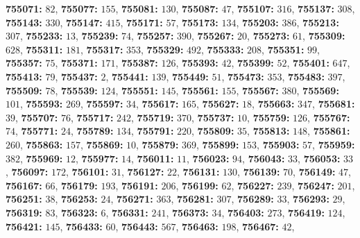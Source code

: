 \textsf{\bfseries 755071:} $82$, \textsf{\bfseries 755077:} $155$, \textsf{\bfseries 755081:} $130$, \textsf{\bfseries 755087:} $47$, \textsf{\bfseries 755107:} $316$, \textsf{\bfseries 755137:} $308$, \textsf{\bfseries 755143:} $330$, \textsf{\bfseries 755147:} $415$, \textsf{\bfseries 755171:} $57$, \textsf{\bfseries 755173:} $134$, \textsf{\bfseries 755203:} $386$, \textsf{\bfseries 755213:} $307$, \textsf{\bfseries 755233:} $13$, \textsf{\bfseries 755239:} $74$, \textsf{\bfseries 755257:} $390$, \textsf{\bfseries 755267:} $20$, \textsf{\bfseries 755273:} $61$, \textsf{\bfseries 755309:} $628$, \textsf{\bfseries 755311:} $181$, \textsf{\bfseries 755317:} $353$, \textsf{\bfseries 755329:} $492$, \textsf{\bfseries 755333:} $208$, \textsf{\bfseries 755351:} $99$, \textsf{\bfseries 755357:} $75$, \textsf{\bfseries 755371:} $171$, \textsf{\bfseries 755387:} $126$, \textsf{\bfseries 755393:} $42$, \textsf{\bfseries 755399:} $52$, \textsf{\bfseries 755401:} $647$, \textsf{\bfseries 755413:} $79$, \textsf{\bfseries 755437:} $2$, \textsf{\bfseries 755441:} $139$, \textsf{\bfseries 755449:} $51$, \textsf{\bfseries 755473:} $353$, \textsf{\bfseries 755483:} $397$, \textsf{\bfseries 755509:} $78$, \textsf{\bfseries 755539:} $124$, \textsf{\bfseries 755551:} $145$, \textsf{\bfseries 755561:} $155$, \textsf{\bfseries 755567:} $380$, \textsf{\bfseries 755569:} $101$, \textsf{\bfseries 755593:} $269$, \textsf{\bfseries 755597:} $34$, \textsf{\bfseries 755617:} $165$, \textsf{\bfseries 755627:} $18$, \textsf{\bfseries 755663:} $347$, \textsf{\bfseries 755681:} $39$, \textsf{\bfseries 755707:} $76$, \textsf{\bfseries 755717:} $242$, \textsf{\bfseries 755719:} $370$, \textsf{\bfseries 755737:} $10$, \textsf{\bfseries 755759:} $126$, \textsf{\bfseries 755767:} $74$, \textsf{\bfseries 755771:} $24$, \textsf{\bfseries 755789:} $134$, \textsf{\bfseries 755791:} $220$, \textsf{\bfseries 755809:} $35$, \textsf{\bfseries 755813:} $148$, \textsf{\bfseries 755861:} $260$, \textsf{\bfseries 755863:} $157$, \textsf{\bfseries 755869:} $10$, \textsf{\bfseries 755879:} $369$, \textsf{\bfseries 755899:} $153$, \textsf{\bfseries 755903:} $57$, \textsf{\bfseries 755959:} $382$, \textsf{\bfseries 755969:} $12$, \textsf{\bfseries 755977:} $14$, \textsf{\bfseries 756011:} $11$, \textsf{\bfseries 756023:} $94$, \textsf{\bfseries 756043:} $33$, \textsf{\bfseries 756053:} $33$, \textsf{\bfseries 756097:} $172$, \textsf{\bfseries 756101:} $31$, \textsf{\bfseries 756127:} $22$, \textsf{\bfseries 756131:} $130$, \textsf{\bfseries 756139:} $70$, \textsf{\bfseries 756149:} $47$, \textsf{\bfseries 756167:} $66$, \textsf{\bfseries 756179:} $193$, \textsf{\bfseries 756191:} $206$, \textsf{\bfseries 756199:} $62$, \textsf{\bfseries 756227:} $239$, \textsf{\bfseries 756247:} $201$, \textsf{\bfseries 756251:} $38$, \textsf{\bfseries 756253:} $24$, \textsf{\bfseries 756271:} $363$, \textsf{\bfseries 756281:} $307$, \textsf{\bfseries 756289:} $33$, \textsf{\bfseries 756293:} $29$, \textsf{\bfseries 756319:} $83$, \textsf{\bfseries 756323:} $6$, \textsf{\bfseries 756331:} $241$, \textsf{\bfseries 756373:} $34$, \textsf{\bfseries 756403:} $273$, \textsf{\bfseries 756419:} $124$, \textsf{\bfseries 756421:} $145$, \textsf{\bfseries 756433:} $60$, \textsf{\bfseries 756443:} $567$, \textsf{\bfseries 756463:} $198$, \textsf{\bfseries 756467:} $42$, 
